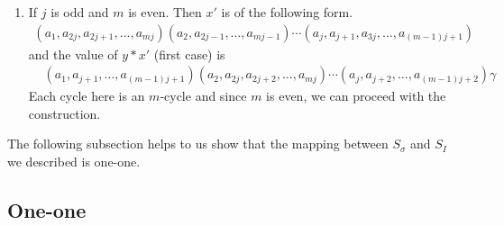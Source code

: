 \documentclass[oneside]{amsart}
\theoremstyle{plain}
\theoremstyle{definition}
\theoremstyle{remark}
\begin{document}
\begin{enumerate}
\begin{enumerate}
                    \item If $j$ is odd and $m$ is even. Then $x'$ is of the following form.
                    \begin{align*}
                        (a_1, a_{2j}, a_{2j + 1}, \ldots, a_{mj})(a_2, a_{2j - 1}, \ldots, a_{mj - 1})\cdots(a_j, a_{j + 1}, a_{3j}, \ldots, a_{(m - 1)j + 1})
                    \end{align*}
                    and the value of $y*x'$ (first case) is
                    \begin{align*}
                        &(a_1, a_{j + 1}, \ldots ,a_{(m - 1)j + 1})(a_2, a_{2j}, a_{2j + 2}, \ldots, a_{mj})\cdots (a_j , a_{j + 2}, \ldots, a_{(m - 1)j + 2})\gamma
                    \end{align*}
                    Each cycle here is an $m$-cycle and since $m$ is even, we can proceed with the construction.
                \end{enumerate}
            \end{enumerate}
        The following subsection helps to us show that the mapping between $S_{\sigma}$ and $S_I$ we described is one-one.
        \subsection{One-one}
    
\end{document}
